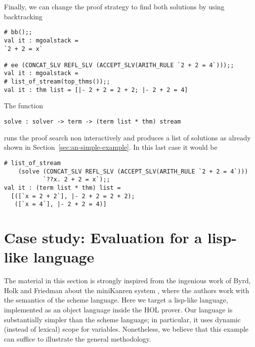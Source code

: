 Finally, we can change the proof strategy to find both solutions by
using backtracking
\begin{verbatim}
# bb();;
val it : mgoalstack =
`2 + 2 = x`

# ee (CONCAT_SLV REFL_SLV (ACCEPT_SLV(ARITH_RULE `2 + 2 = 4`)));;
val it : mgoalstack =
# list_of_stream(top_thms());;
val it : thm list = [|- 2 + 2 = 2 + 2; |- 2 + 2 = 4]
\end{verbatim}

The function
\begin{verbatim}
solve : solver -> term -> (term list * thm) stream
\end{verbatim}
runs the proof search non interactively and produces a list of
solutions as already shown in Section~\ref{sec:an-simple-example}.  In
this last case it would be
\begin{verbatim}
# list_of_stream
    (solve (CONCAT_SLV REFL_SLV (ACCEPT_SLV(ARITH_RULE `2 + 2 = 4`)))
           `??x. 2 + 2 = x`);;
val it : (term list * thm) list =
  [([`x = 2 + 2`], |- 2 + 2 = 2 + 2);
   ([`x = 4`], |- 2 + 2 = 4)]
\end{verbatim}



\section{Case study: Evaluation for a lisp-like language}
\label{sec:lisp-eval}

The material in this section is strongly inspired from the ingenious
work of Byrd, Holk and Friedman about the miniKanren system
\citep{Byrd:2012:MLU:2661103.2661105}, where the authors work with the
semantics of the scheme language.  Here we target a lisp-like
language, implemented as an object language inside the HOL prover.
Our language is substantially simpler than the scheme language; in
particular, it uses dynamic (instead of lexical) scope for variables.
Nonetheless, we believe that this example can suffice to illustrate
the general methodology.

